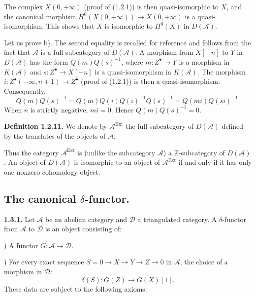\clearpage
{}%
\begingroup\small\setlength{\parskip}{0pt}\setlength{\emergencystretch}{1.5em}
\setlength{\abovedisplayskip}{4pt plus 2pt minus 2pt}%
\setlength{\belowdisplayskip}{4pt plus 2pt minus 2pt}%

The complex $X(0,+\infty)$ (proof of (1.2.1)) is then quasi-isomorphic to
$X$, and the canonical morphism
$H^0(X(0,+\infty))\longrightarrow X(0,+\infty)$ is a quasi-isomorphism.
This shows that $X$ is isomorphic to $H^0(X)$ in $D(\mathcal A)$.

Let us prove b). The second equality is recalled for reference and follows
from the fact that $\mathcal A$ is a full subcategory of $D(\mathcal A)$.
A morphism from $X[-n]$ to $Y$ in $D(\mathcal A)$ has the form
$Q(m)Q(s)^{-1}$, where $m\colon Z^\bullet\longrightarrow Y$ is a morphism in
$K(\mathcal A)$ and $s\colon Z^\bullet\longrightarrow X[-n]$ is a
quasi-isomorphism in $K(\mathcal A)$. The morphism
$i\colon Z^\bullet(-\infty,n+1)\longrightarrow Z^\bullet$ (proof of
(1.2.1)) is then a quasi-isomorphism. Consequently,
\[
Q(m)Q(s)^{-1}=Q(m)Q(i)Q(i)^{-1}Q(s)^{-1}=Q(mi)Q(si)^{-1}.
\]
When $n$ is strictly negative, $mi=0$. Hence $Q(m)Q(s)^{-1}=0$.

\medskip\noindent\textbf{Definition 1.2.11.}\quad
We denote by $\mathcal A^{\operatorname{Ext}}$ the full subcategory of
$D(\mathcal A)$ defined by the translates of the objects of $\mathcal A$.

Thus the category $\mathcal A^{\operatorname{Ext}}$ is (unlike the
subcategory $\mathcal A$) a $\mathbb Z$-subcategory of $D(\mathcal A)$. An
object of $D(\mathcal A)$ is isomorphic to an object of
$\mathcal A^{\operatorname{Ext}}$ if and only if it has only one nonzero
cohomology object.

\subsection{The canonical \texorpdfstring{$\delta$}{delta}-functor.}

\noindent\textbf{1.3.1.}\quad
Let $\mathcal A$ be an abelian category and $\mathcal D$ a triangulated
category. A $\delta$-functor from $\mathcal A$ to $\mathcal D$ is an object
consisting of:

) A functor $G\colon\mathcal A\longrightarrow\mathcal D$.

) For every exact sequence
$S=0\longrightarrow X\longrightarrow Y\longrightarrow Z\longrightarrow0$
in $\mathcal A$, the choice of a morphism in $\mathcal D$:
\[
\delta(S)\colon G(Z)\longrightarrow G(X)[1].
\]
These data are subject to the following axioms:

